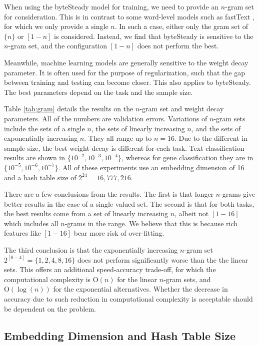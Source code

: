 \documentclass{article}
\begin{document}
When using the byteSteady model for training, we need to provide an \(n\)-gram set for consideration. This is in contrast to some word-level models such as fastText \cite{JGBM16}, for which we only provide a single \(n\). In such a case, either only the gram set of \(\{n\}\) or \([1-n]\) is considered. Instead, we find that byteSteady is sensitive to the \(n\)-gram set, and the configuration \([1-n]\) does not perform the best.

Meanwhile, machine learning models are generally sensitive to the weight decay parameter. It is often used for the purpose of regularization, such that the gap between training and testing can become closer. This also applies to byteSteady. The best parameters depend on the task and the sample size.

Table \ref{tab:gram} details the results on the \(n\)-gram set and weight decay parameters. All of the numbers are validation errors. Variations of \(n\)-gram sets include the sets of a single \(n\), the sets of linearly increasing \(n\), and the sets of exponentially increasing \(n\). They all range up to \(n=16\). Due to the different in sample size, the best weight decay is different for each task. Text classification results are shown in \(\{10^{-2}, 10^{-3}, 10^{-4}\}\), whereas for gene classification they are in \(\{10^{-5}, 10^{-6}, 10^{-7}\}\). All of these experiments use an embedding dimension of 16 and a hash table size of \(2^{24}=16,777,216\).

There are a few conclusions from the results. The first is that longer \(n\)-grams give better results in the case of a single valued set. The second is that for both tasks, the best results come from a set of linearly increasing \(n\), albeit not \([1-16]\) which includes all \(n\)-grams in the range. We believe that this is because rich features like \([1-16]\) bear more risk of over-fitting.

The third conclusion is that the exponentially increasing \(n\)-gram set \(2^{[0-4]}=\{1,2,4,8,16\}\) does not perform significantly worse than the the linear sets. This offers an additional speed-accuracy trade-off, for which the computational complexity is \(\mathrm{O}(n)\) for the linear \(n\)-gram sets, and \(\mathrm{O}(\log(n))\) for the exponential alternatives. Whether the decrease in accuracy due to such reduction in computational complexity is acceptable should be dependent on the problem.

\subsection{Embedding Dimension and Hash Table Size}
\end{document}
